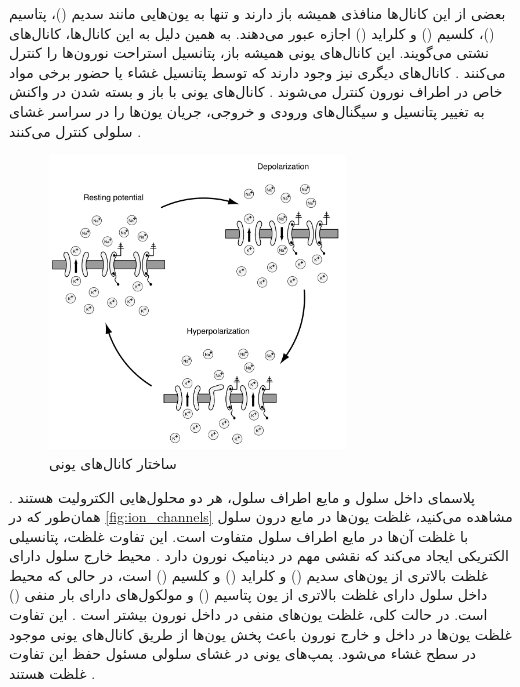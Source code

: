 بعضی از این کانال‌ها منافذی همیشه باز دارند و تنها به یون‌هایی مانند سدیم
()،
پتاسیم
()،
کلسیم
()
و کلراید
()
اجازه عبور می‌دهند.
به همین دلیل به این کانال‌ها، کانال‌های نشتی می‌گویند.
این کانال‌های یونی همیشه باز، پتانسیل استراحت نورون‌ها را کنترل می‌کنند
\cite{trappenberg2022}.
کانال‌های دیگری نیز وجود دارند که توسط پتانسیل غشاء یا حضور برخی مواد خاص در اطراف نورون کنترل می‌شوند
\cite{graben2008}.
کانال‌های یونی با باز و بسته شدن در واکنش به تغییر پتانسیل و سیگنال‌های ورودی و خروجی، جریان یون‌ها را در سراسر غشای سلولی کنترل می‌کنند
\cite{dayan2001}.

\begin{figure}[!ht]
    \centering
    \includegraphics[width=0.7\textwidth]{figures/ion_channel}
    \caption[ساختار کانال‌های یونی]{ساختار کانال‌های یونی \cite{trappenberg2022}}
    \label{fig:ion_channels}
\end{figure}

پلاسمای داخل سلول و مایع اطراف سلول، هر دو محلول‌هایی الکترولیت هستند
\cite{graben2008}.
همان‌طور که در
\autoref{fig:ion_channels}
مشاهده می‌کنید، غلظت یون‌ها در مایع درون سلول با غلظت آن‌ها در مایع اطراف سلول متفاوت است.
این تفاوت غلظت، پتانسیلی الکتریکی ایجاد می‌کند که نقشی مهم در دینامیک نورون دارد
\cite{gerstner2002}.
محیط خارج سلول دارای غلظت بالاتری از یون‌های سدیم
()
و کلراید
()
و کلسیم
()
است، در حالی که محیط داخل سلول دارای غلظت بالاتری از یون پتاسیم
()
و مولکول‌های دارای بار منفی
()
است.
در حالت کلی، غلظت یون‌های منفی در داخل نورون بیشتر است
\cite{izhikevich2006}.
این تفاوت غلظت یون‌ها در داخل و خارج نورون باعث پخش یون‌ها از طریق کانال‌های یونی موجود در سطح غشاء می‌شود.
پمپ‌های یونی در غشای سلولی مسئول حفظ این تفاوت غلظت هستند
\cite{dayan2001}.


